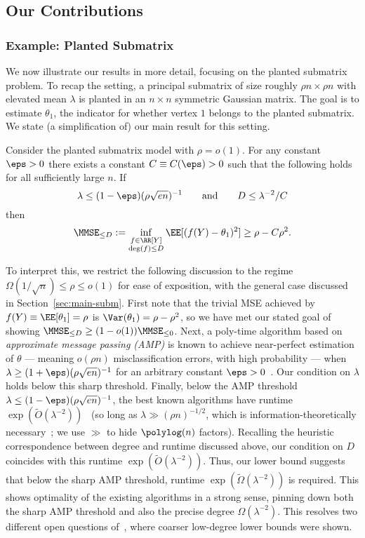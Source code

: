 \documentclass[11pt]{article}
\begin{document}
\subsection{Our Contributions}

\subsubsection{Example: Planted Submatrix}

We now illustrate our results in more detail, focusing on the planted submatrix problem. To recap the setting, a principal submatrix of size roughly $\rho n \times \rho n$ with elevated mean $\lambda$ is planted in an $n \times n$ symmetric Gaussian matrix. The goal is to estimate $\theta_1$, the indicator for whether vertex $1$ belongs to the planted submatrix. We state (a simplification of) our main result for this setting.

\begin{theorem}
Consider the planted submatrix model with $\rho = o(1)$. For any constant $\eps > 0$ there exists a constant $C \equiv C(\eps) > 0$ such that the following holds for all sufficiently large $n$. If
\[ \lambda \le (1-\eps)(\rho\sqrt{en})^{-1} \qquad \text{and} \qquad D \le \lambda^{-2}/C \]
then
\[ \MMSE_{\le D} := \inf_{\substack{f \in \RR[Y] \\ \deg(f) \le D}} \EE[(f(Y)-\theta_1)^2] \ge \rho - C \rho^2. \]
\end{theorem}

To interpret this, we restrict the following discussion to the regime $\Omega(1/\sqrt{n}) \le \rho \le o(1)$ for ease of exposition, with the general case discussed in Section~\ref{sec:main-subm}. First note that the trivial MSE achieved by $f(Y) \equiv \EE[\theta_1] = \rho$ is $\Var(\theta_1) = \rho - \rho^2$, so we have met our stated goal of showing $\MMSE_{\leq D}\geq (1-o(1))\MMSE_{\leq 0}$. 
Next, a poly-time algorithm based on \emph{approximate message passing (AMP)} is known to achieve near-perfect estimation of $\theta$ --- meaning $o(\rho n)$ misclassification errors, with high probability --- when $\lambda \ge (1+\eps) (\rho\sqrt{en})^{-1}$ for an arbitrary constant $\eps > 0$~\cite{submatrix-amp}. Our condition on $\lambda$ holds below this sharp threshold. Finally, below the AMP threshold $\lambda \le (1-\eps)(\rho\sqrt{en})^{-1}$, the best known algorithms have runtime $\exp(\tilde{O}(\lambda^{-2}))$~\cite{subexp-sparse,anytime-sparse} (so long as $\lambda \gg (\rho n)^{-1/2}$, which is information-theoretically necessary~\cite{kolar-info,BIS-info}; we use $\gg$ to hide $\polylog(n)$ factors). Recalling the heuristic correspondence between degree and runtime discussed above, our condition on $D$ coincides with this runtime $\exp(\tilde{O}(\lambda^{-2}))$. Thus, our lower bound suggests that below the sharp AMP threshold, runtime $\exp(\tilde{\Omega}(\lambda^{-2}))$ is required. This shows optimality of the existing algorithms in a strong sense, pinning down both the sharp AMP threshold and also the precise degree $\Omega(\lambda^{-2})$. This resolves two different open questions of~\cite{SW-estimation}, where coarser low-degree lower bounds were shown.
\end{document}
